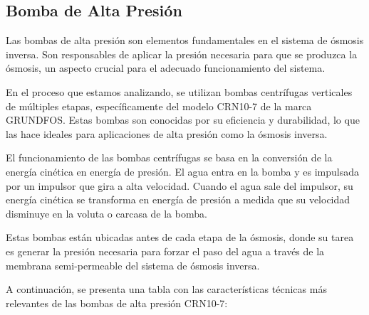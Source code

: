 \subsection{Bomba de Alta Presión}

Las bombas de alta presión son elementos fundamentales en el sistema de ósmosis inversa. Son responsables de aplicar la presión necesaria para que se produzca la ósmosis, un aspecto crucial para el adecuado funcionamiento del sistema.

En el proceso que estamos analizando, se utilizan bombas centrífugas verticales de múltiples etapas, específicamente del modelo CRN10-7 de la marca GRUNDFOS. Estas bombas son conocidas por su eficiencia y durabilidad, lo que las hace ideales para aplicaciones de alta presión como la ósmosis inversa.

El funcionamiento de las bombas centrífugas se basa en la conversión de la energía cinética en energía de presión. El agua entra en la bomba y es impulsada por un impulsor que gira a alta velocidad. Cuando el agua sale del impulsor, su energía cinética se transforma en energía de presión a medida que su velocidad disminuye en la voluta o carcasa de la bomba.

Estas bombas están ubicadas antes de cada etapa de la ósmosis, donde su tarea es generar la presión necesaria para forzar el paso del agua a través de la membrana semi-permeable del sistema de ósmosis inversa.



A continuación, se presenta una tabla con las características técnicas más relevantes de las bombas de alta presión CRN10-7:\\

